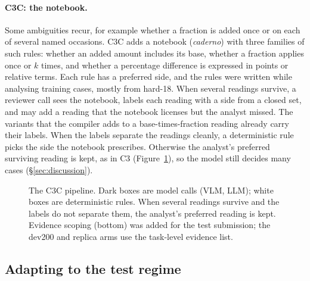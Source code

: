 \documentclass[11pt]{article}%
\begin{document}


\paragraph{\textsc{C3C}: the notebook.} Some ambiguities recur, for example
whether a fraction is added once or on each of several named occasions.
\textsc{C3C} adds a notebook (\emph{caderno}) with three families of such
rules: whether an added amount includes its base, whether a fraction applies
once or $k$ times, and whether a percentage difference is expressed in points
or relative terms. Each rule has a preferred side, and the rules were written
while analysing training cases, mostly from hard-18. When several readings
survive, a reviewer call sees the notebook, labels each reading with a side
from a closed set, and may add a reading that the notebook licenses but the
analyst missed. The variants that the compiler adds to a base-times-fraction
reading already carry their labels. When the
labels separate the readings cleanly, a deterministic rule picks the side the
notebook prescribes. Otherwise the analyst's preferred surviving reading is
kept, as in \textsc{C3} (Figure~\ref{fig:pipeline}), so the model still
decides many cases (\S\ref{sec:discussion}).

\begin{figure}[!t]
\centering
\resizebox{\columnwidth}{!}{}
\caption{The \textsc{C3C} pipeline. Dark boxes are model calls (VLM, LLM);
white boxes are deterministic rules. When several readings survive and the labels do not separate
them, the analyst's preferred reading is kept. Evidence scoping (bottom) was
added for the test submission; the dev200 and replica arms use the task-level
evidence list.}
\label{fig:pipeline}
\end{figure}

\subsection{Adapting to the test regime}
\label{sec:submitted}
\end{document}
